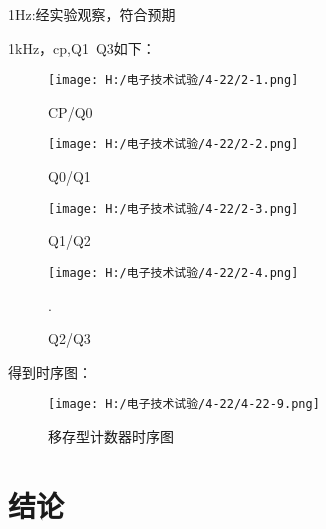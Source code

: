 \documentclass{article}
\begin{document}
1Hz:经实验观察，符合预期\par
\newpage
1kHz，cp,Q1~Q3如下：
\begin{figure}[h]
    \begin{minipage}[t]{0.5\linewidth} %
      \centering   
      \texttt{[image: H:/电子技术试验/4-22/2-1.png]}   
      \caption{CP/Q0}   
      \label{fig:side:a}   
    \end{minipage}%
    \begin{minipage}[t]{0.5\linewidth}   
      \centering   
      \texttt{[image: H:/电子技术试验/4-22/2-2.png]}   
      \caption{Q0/Q1}   
      \label{fig:side:b}   
    \end{minipage}   
\end{figure}
    \begin{figure}[h]
        \begin{minipage}[t]{0.5\linewidth} %
          \centering   
          \texttt{[image: H:/电子技术试验/4-22/2-3.png]}   
          \caption{Q1/Q2}   
          \label{fig:side:a}   
        \end{minipage}%
        \begin{minipage}[t]{0.5\linewidth}   
          \centering   
          \texttt{[image: H:/电子技术试验/4-22/2-4.png]}   
          \caption{Q2/Q3}   
          \label{fig:side:b}   
        \end{minipage}   .
    \end{figure}
得到时序图：
\begin{figure}[h]
    \centering
    \texttt{[image: H:/电子技术试验/4-22/4-22-9.png]}
    \caption{移存型计数器时序图} \label{fig:aa}
    \end{figure}



\newpage
\section{结论}
\end{document}
